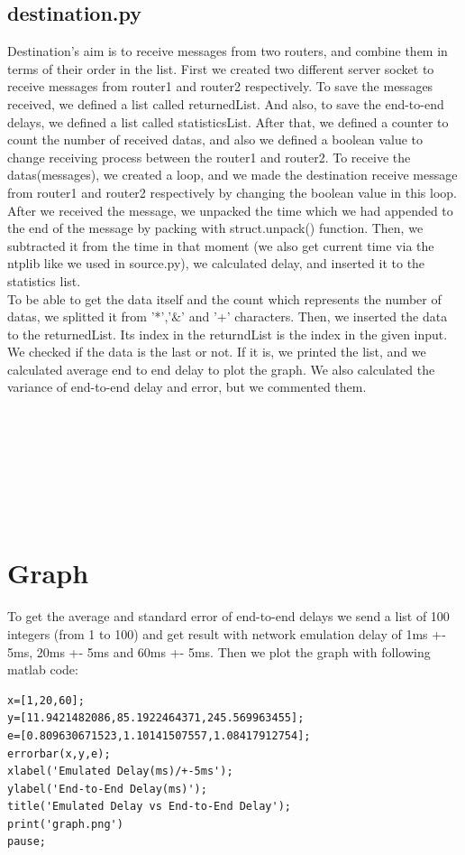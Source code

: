 \documentclass[conference]{IEEEtran}
\begin{document}
\subsection{destination.py}
Destination's aim is to receive messages from two routers, and combine them in terms of their order in the list. First we created two different server socket to receive messages from router1 and router2 respectively. To save the messages received, we defined a list called returnedList. And also, to save the end-to-end delays, we defined a list called statisticsList. After that, we defined a counter to count the number of received datas, and also we defined a boolean value to change receiving process between the router1 and router2. To receive the datas(messages), we created a loop, and we made the destination receive message from router1 and router2 respectively by changing the boolean value in this loop. After we received the message, we unpacked the time which we had appended to the end of the message by packing with struct.unpack() function. Then, we subtracted it from the time in that moment (we also get current time via the ntplib like we used in source.py), we calculated delay, and inserted it to the statistics list. \\
To be able to get the data itself and the count which represents the number of datas, we splitted it from '*','$\&$' and '+' characters. Then, we inserted the data to the returnedList. Its index in the returndList is the index in the given input. We checked if the data is the last or not. If it is, we printed the list, and we calculated average end to end delay to plot the graph. We also calculated the variance of end-to-end delay and error, but we commented them. \\
\\
\\
\\
\\
\\
\\
\\

\section{Graph}
To get the average and standard error of end-to-end delays we send a list of 100 integers (from 1 to 100) and get result with network emulation delay of 1ms +- 5ms, 20ms +- 5ms and 60ms +- 5ms. Then we plot the graph with following matlab code: \\
\begin{verbatim}
x=[1,20,60]; 
y=[11.9421482086,85.1922464371,245.569963455]; 
e=[0.809630671523,1.10141507557,1.08417912754]; 
errorbar(x,y,e); 
xlabel('Emulated Delay(ms)/+-5ms'); 
ylabel('End-to-End Delay(ms)');
title('Emulated Delay vs End-to-End Delay');
print('graph.png')
pause;
\end{verbatim}
\end{document}
